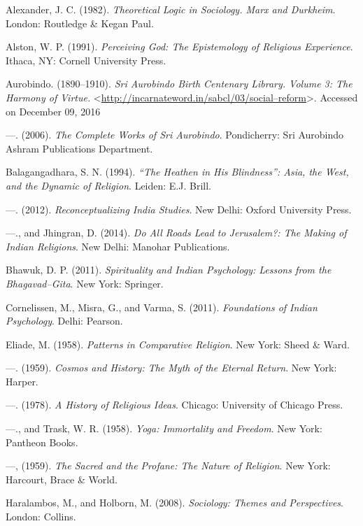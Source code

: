 \begin{thebibliography}{99}
 Alexander, J. C. (1982). \textit{Theoretical Logic in Sociology. Marx and Durkheim}. London: Routledge \& Kegan Paul.

  Alston, W. P. (1991). \textit{Perceiving God: The Epistemology of Religious Experience}. Ithaca, NY: Cornell University Press.

  Aurobindo. (1890–1910). \textit{Sri Aurobindo Birth Centenary Library. Volume 3: The Harmony of Virtue.} \textless \url{http://incarnateword.in/sabcl/03/social–reform}\textgreater . Accessed on December 09, 2016

  —. (2006). \textit{The Complete Works of Sri Aurobindo}. Pondicherry: Sri Aurobindo Ashram Publications Department.

  Balagangadhara, S. N. (1994). \textit{“The Heathen in His Blindness”: Asia, the West, and the Dynamic of Religion}. Leiden: E.J. Brill.

  —. (2012). \textit{Reconceptualizing India Studies}. New Delhi: Oxford University Press.

  —., and Jhingran, D. (2014). \textit{Do All Roads Lead to Jerusalem?: The Making of Indian Religions}. New Delhi: Manohar Publications.

  Bhawuk, D. P. (2011). \textit{Spirituality and Indian Psychology: Lessons from the Bhagavad–Gita}. New York: Springer.

  Cornelissen, M., Misra, G., and Varma, S. (2011). \textit{Foundations of Indian Psychology}. Delhi: Pearson.

  Eliade, M. (1958). \textit{Patterns in Comparative Religion}. New York: Sheed \& Ward.

  —. (1959). \textit{Cosmos and History: The Myth of the Eternal Return}. New York: Harper.

  —. (1978). \textit{A History of Religious Ideas}. Chicago: University of Chicago Press.

  —., and Trask, W. R. (1958). \textit{Yoga: Immortality and Freedom}. New York: Pantheon Books.

  —, (1959). \textit{The Sacred and the Profane: The Nature of Religion}. New York: Harcourt, Brace \& World.

  Haralambos, M., and Holborn, M. (2008). \textit{Sociology: Themes and Perspectives}. London: Collins.


\end{thebibliography}
